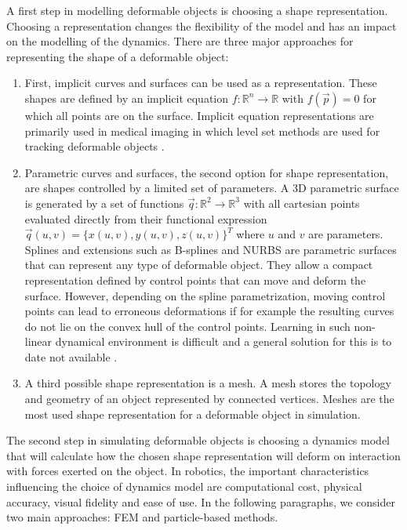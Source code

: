 \documentclass[\home/main.tex]{subfiles}
\begin{document}
A first step in modelling deformable objects is choosing a shape representation. Choosing a representation changes the flexibility of the model and has an impact on the modelling of the dynamics. There are three major approaches for representing the shape of a deformable object:
\begin{enumerate}
	\item First, implicit curves and surfaces can be used as a representation. These shapes are defined by an implicit equation $f: \mathbb{R}^{n} \rightarrow \mathbb{R}$ with $f(\vec{p}) = 0$ for which all points are on the surface. Implicit equation representations are primarily used in medical imaging in which level set methods are used for tracking deformable objects \autocite{Cremers2006}. 
	\item Parametric curves and surfaces, the second option for shape representation, are shapes controlled by a limited set of parameters. A 3D parametric surface is generated by a set of functions $\vec{q}: \mathbb{R}^{2} \rightarrow \mathbb{R}^{3}$ with all cartesian points evaluated directly from their functional expression\\$\vec{q}(u, v) = \{x(u, v), y(u, v), z(u, v)\}^{T}$ where $u$ and $v$ are parameters. Splines and extensions such as B-splines and NURBS are parametric surfaces that can represent any type of deformable object. They allow a compact representation defined by control points that can move and deform the surface. However, depending on the spline parametrization, moving control points can lead to erroneous deformations if for example the resulting curves do not lie on the convex hull of the control points. Learning in such non-linear dynamical environment is difficult and a general solution for this is to date not available \autocite{rios2020}.
	\item A third possible shape representation is a mesh. A mesh stores the topology and geometry of an object represented by connected vertices. Meshes are the most used shape representation for a deformable object in simulation.
\end{enumerate}

The second step in simulating deformable objects is choosing a dynamics model that will calculate how the chosen shape representation will deform on interaction with forces exerted on the object. In robotics, the important characteristics influencing the choice of dynamics model are computational cost, physical accuracy, visual fidelity and ease of use. In the following paragraphs, we consider two main approaches: \gls{FEM} and particle-based methods.
\end{document}

